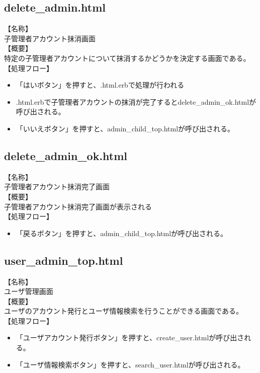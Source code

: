 \documentclass[a4j]{jarticle}
\begin{document}
\subsection{delete\_admin.html}
\noindent
【名称】\\
子管理者アカウント抹消画面\\
【概要】\\
特定の子管理者アカウントについて抹消するかどうかを決定する画面である。\\
【処理フロー】
\begin{itemize}
\item 「はいボタン」を押すと、.html.erbで処理が行われる
\item .html.erbで子管理者アカウントの抹消が完了するとdelete\_admin\_ok.htmlが呼び出される。
\item 「いいえボタン」を押すと、admin\_child\_top.htmlが呼び出される。
\end{itemize}

\subsection{delete\_admin\_ok.html}
\noindent
【名称】\\
子管理者アカウント抹消完了画面\\
【概要】\\
子管理者アカウント抹消完了画面が表示される\\
【処理フロー】
\begin{itemize}
\item 「戻るボタン」を押すと、admin\_child\_top.htmlが呼び出される。
\end{itemize}

\subsection{user\_admin\_top.html}
\noindent
【名称】\\
ユーザ管理画面\\
【概要】\\
ユーザのアカウント発行とユーザ情報検索を行うことができる画面である。\\
【処理フロー】
\begin{itemize}
\item 「ユーザアカウント発行ボタン」を押すと、create\_user.htmlが呼び出される。
\item 「ユーザ情報検索ボタン」を押すと、search\_user.htmlが呼び出される。
\end{itemize}
\end{document}
